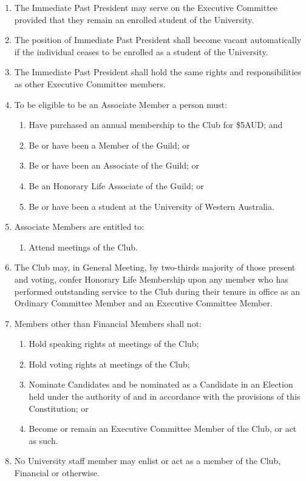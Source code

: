 \documentclass[12pt]{article}
\begin{document}
\begin{enumerate}[label=4.\arabic*]
\begin{enumerate}[label=\theenumi.\arabic*]
        \item The Secretary; and
        \item The Treasurer.
    \end{enumerate}
    \item The Immediate Past President may serve on the Executive Committee provided that they remain an enrolled student of the University.
    \item The position of Immediate Past President shall become vacant automatically if the individual ceases to be enrolled as a student of the University.
    \item The Immediate Past President shall hold the same rights and responsibilities as other Executive Committee members.
    \item To be eligible to be an Associate Member a person must:
    \begin{enumerate}[label=\theenumi.\arabic*]
        \item Have purchased an annual membership to the Club for \$5AUD; and 
        \item Be or have been a Member of the Guild; or
        \item Be or have been an Associate of the Guild; or
        \item Be an Honorary Life Associate of the Guild; or
        \item Be or have been a student at the University of Western Australia.
    \end{enumerate}
    \item Associate Members are entitled to:
    \begin{enumerate}[label=\theenumi.\arabic*]
        \item Attend meetings of the Club.
    \end{enumerate}
    \item The Club may, in General Meeting, by two-thirds majority of those present and voting, confer Honorary Life Membership upon any member who has performed outstanding service to the Club during their tenure in office as an Ordinary Committee Member and an Executive Committee Member.
    \item Members other than Financial Members shall not:
    \begin{enumerate}[label=\theenumi.\arabic*]
        \item Hold speaking rights at meetings of the Club;
        \item Hold voting rights at meetings of the Club;
        \item Nominate Candidates and be nominated as a Candidate in an Election held under the authority of and in accordance with the provisions of this Constitution; or
        \item Become or remain an Executive Committee Member of the Club, or act as such.
    \end{enumerate}
    \item No University staff member may enlist or act as a member of the Club, Financial or otherwise.
\end{enumerate}
\end{document}
